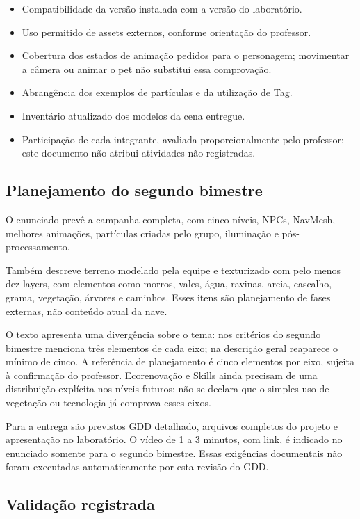 \documentclass[12pt,a4paper]{article}
\begin{document}
\begin{itemize}
\item Compatibilidade da versão instalada com a versão do laboratório.
\item Uso permitido de assets externos, conforme orientação do professor.
\item Cobertura dos estados de animação pedidos para o personagem;
movimentar a câmera ou animar o pet não substitui essa comprovação.
\item Abrangência dos exemplos de partículas e da utilização de Tag.
\item Inventário atualizado dos modelos da cena entregue.
\item Participação de cada integrante, avaliada proporcionalmente
pelo professor; este documento não atribui atividades não registradas.
\end{itemize}

\subsection{Planejamento do segundo bimestre}

O enunciado prevê a campanha completa, com cinco níveis,
NPCs, NavMesh, melhores animações, partículas criadas pelo grupo,
iluminação e pós-processamento.

Também descreve terreno modelado pela equipe e texturizado com
pelo menos dez layers, com elementos como morros, vales, água,
ravinas, areia, cascalho, grama, vegetação, árvores e caminhos.
Esses itens são planejamento de fases externas, não conteúdo
atual da nave.

O texto apresenta uma divergência sobre o tema: nos critérios do
segundo bimestre menciona três elementos de cada eixo; na descrição
geral reaparece o mínimo de cinco. A referência de planejamento
é cinco elementos por eixo, sujeita à confirmação do professor.
Ecorenovação e Skills ainda precisam de uma distribuição explícita
nos níveis futuros; não se declara que o simples uso de vegetação
ou tecnologia já comprova esses eixos.

Para a entrega são previstos GDD detalhado, arquivos completos
do projeto e apresentação no laboratório. O vídeo de 1 a 3 minutos,
com link, é indicado no enunciado somente para o segundo bimestre.
Essas exigências documentais não foram executadas automaticamente
por esta revisão do GDD.

\subsection{Validação registrada}
\end{document}
